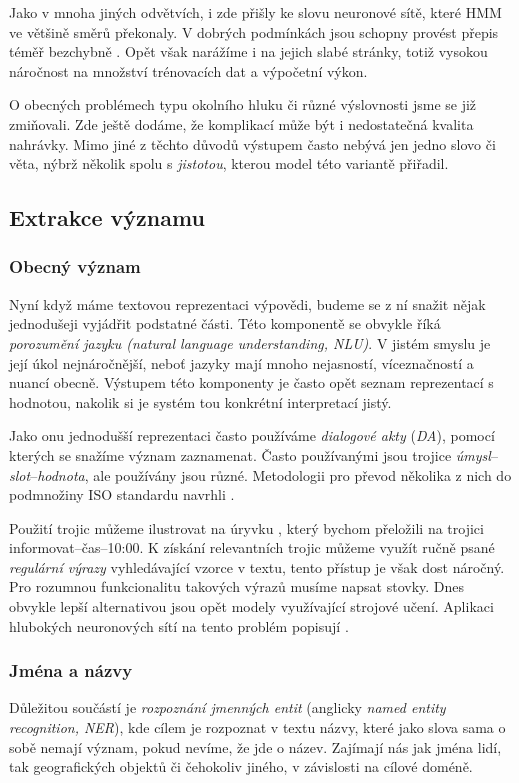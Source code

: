 Jako v mnoha jiných odvětvích, i zde přišly ke slovu neuronové sítě, které HMM
ve většině směrů překonaly. V dobrých podmínkách jsou schopny provést přepis
téměř bezchybně \citep{zhang_pushing_2020}. Opět však narážíme i na jejich slabé stránky,
totiž vysokou náročnost na množství trénovacích dat a výpočetní výkon.

O obecných problémech typu okolního hluku či různé výslovnosti jsme se
již zmiňovali. Zde ještě dodáme, že komplikací může být i nedostatečná kvalita
nahrávky. Mimo jiné z těchto důvodů výstupem často nebývá jen jedno
slovo či věta, nýbrž několik spolu s \textit{jistotou}, kterou model této
variantě přiřadil.

\subsection{Extrakce významu}\label{nlu}

\subsubsection{Obecný význam}
Nyní když máme textovou reprezentaci výpovědi, budeme se z ní snažit nějak
jednodušeji vyjádřit podstatné části. Této komponentě se obvykle říká
\textit{porozumění jazyku (natural language understanding, NLU)}. V jistém
smyslu je její úkol nejnáročnější, neboť jazyky mají mnoho nejasností,
víceznačností a nuancí obecně. Výstupem této komponenty je často opět
seznam reprezentací s hodnotou, nakolik si je systém tou konkrétní
interpretací jistý.

Jako onu jednodušší reprezentaci často používáme \textit{dialogové akty}
(\textit{DA}), pomocí kterých se snažíme význam zaznamenat. Často
používanými jsou trojice \textit{úmysl}--\textit{slot}--\textit{hodnota},
ale používány jsou různé. Metodologii pro převod několika z nich do podmnožiny
ISO standardu navrhli \citet{mezza_iso-standard_2018}.

Použití trojic můžeme ilustrovat na úryvku , který bychom
přeložili na trojici
informovat--čas--10:00. K získání relevantních trojic můžeme využít ručně
psané \textit{regulární výrazy} vyhledávající vzorce v textu, tento přístup
je však dost náročný. Pro rozumnou funkcionalitu takových výrazů musíme napsat
stovky. Dnes obvykle lepší alternativou jsou opět modely využívající strojové
učení. Aplikaci hlubokých neuronových sítí na tento problém
popisují \citet{liu_multi-task_2019}.

\subsubsection{Jména a názvy}
Důležitou součástí je \textit{rozpoznání jmenných entit} (anglicky
\textit{named entity recognition, NER}),
kde cílem je rozpoznat v textu názvy, které jako slova sama o sobě nemají
význam, pokud nevíme, že jde o název. Zajímají nás jak jména lidí, tak
geografických objektů či čehokoliv jiného, v závislosti na cílové doméně.

